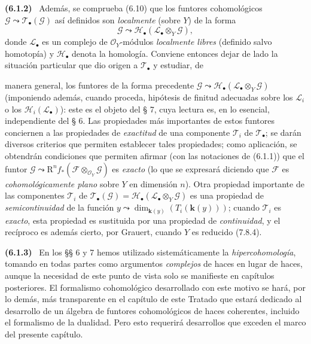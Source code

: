 \documentclass[10pt,oneside]{book}
\newcommand{\oldpage}[2][]{\setcounter{footnote}{0}\marginpar{\scriptsize\textbf{#1}~|~#2}\ignorespaces}
\newenvironment{env}[1][]{\par\medskip\noindent\textbf{(#1)}\ }{\par}
\begin{document}
\begin{env}[6.1.2]
\label{III.6.1.2}
Además, se comprueba (6.10) que los funtores cohomológicos
$\mathscr G\leadsto\mathscr T_\bullet(\mathscr G)$ así definidos son
\emph{localmente} (sobre $Y$) de la forma
\[
  \mathscr G\leadsto
  \mathscr H_\bullet(\mathscr L_\bullet\otimes_Y\mathscr G),
\]
donde $\mathscr L_\bullet$ es un complejo de $\mathscr O_Y$-módulos
\emph{localmente libres} (definido salvo homotopía) y $\mathscr H_\bullet$ denota la
homología. Conviene entonces dejar de lado la situación particular que dio
origen a $\mathscr T_\bullet$ y estudiar, de

\oldpage[III]{138}

manera general, los funtores de la forma precedente
$\mathscr G\leadsto\mathscr H_\bullet(\mathscr L_\bullet\otimes_Y\mathscr G)$
(imponiendo además, cuando proceda, hipótesis de finitud adecuadas sobre los
$\mathscr L_i$ o los $\mathscr H_i(\mathscr L_\bullet)$): este es el objeto
del § 7, cuya lectura es, en lo esencial, independiente del § 6. Las
propiedades más importantes de estos funtores conciernen a las propiedades de
\emph{exactitud} de una componente $\mathscr T_i$ de $\mathscr T_\bullet$; se darán
diversos criterios que permiten establecer tales propiedades; como
aplicación, se obtendrán condiciones que permiten afirmar (con las notaciones
de (6.1.1)) que el funtor
$\mathscr G\leadsto\mathrm R^n f_*(\mathscr F\otimes_{\mathscr O_Y}\mathscr G)$
es \emph{exacto} (lo que se expresará diciendo que $\mathscr F$ es
\emph{cohomológicamente plano} sobre $Y$ en dimensión $n$). Otra propiedad
importante de las componentes $\mathscr T_i$ de
$\mathscr T_\bullet(\mathscr G)=
\mathscr H_\bullet(\mathscr L_\bullet\otimes_Y\mathscr G)$ es una propiedad
de \emph{semicontinuidad} de la función
$y\leadsto\dim_{\boldsymbol k(y)}(T_i(\boldsymbol k(y)))$; cuando $\mathscr T_i$ es \emph{exacto}, esta
propiedad es sustituida por una propiedad de \emph{continuidad}, y el recíproco es
además cierto, por Grauert, cuando $Y$ es reducido (7.8.4).
\end{env}

\begin{env}[6.1.3]
\label{III.6.1.3}
En los §§ 6 y 7 hemos utilizado sistemáticamente la \emph{hipercohomología}, tomando
en todas partes como argumentos \emph{complejos} de haces en lugar de haces, aunque
la necesidad de este punto de vista solo se manifieste en capítulos
posteriores. El formalismo cohomológico desarrollado con este motivo se hará,
por lo demás, más transparente en el capítulo de este Tratado que estará
dedicado al desarrollo de un álgebra de funtores cohomológicos de haces
coherentes, incluido el formalismo de la dualidad. Pero esto requerirá
desarrollos que exceden el marco del presente capítulo.
\end{env}
\end{document}
